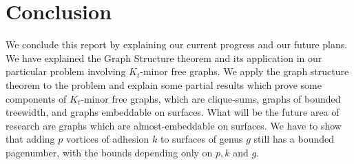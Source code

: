 \documentclass[]{report}
\theoremstyle{definition}
\numberwithin{theorem}{section}
\numberwithin{equation}{section}
\begin{document}
\chapter{Conclusion}
We conclude this report by explaining our current progress and our future plans. We have explained the Graph Structure theorem \cite{robertsonGraphMinorsXVI2003} and its application in our particular problem involving $K_t$-minor free graphs. We apply the graph structure theorem to the problem and explain some partial results which prove some components of $K_t$-minor free graphs, which are clique-sums, graphs of bounded treewidth, and graphs embeddable on surfaces. What will be the future area of research are graphs which are almost-embeddable on surfaces. We have to show that adding $p$ vortices of adhesion $k$ to surfaces of genus $g$ still has a bounded pagenumber, with the bounds depending only on $p, k$ and $g$. 
\printbibliography
\end{document}
